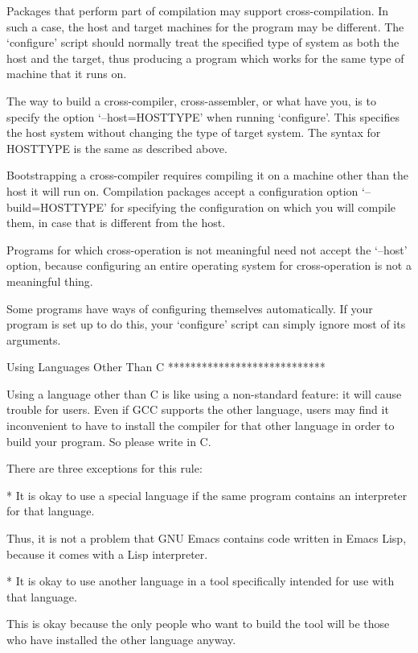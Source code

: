    Packages that perform part of compilation may support
cross-compilation.  In such a case, the host and target machines for
the program may be different.  The `configure' script should normally
treat the specified type of system as both the host and the target,
thus producing a program which works for the same type of machine that
it runs on.

   The way to build a cross-compiler, cross-assembler, or what have
you, is to specify the option `--host=HOSTTYPE' when running
`configure'.  This specifies the host system without changing the type
of target system.  The syntax for HOSTTYPE is the same as described
above.

   Bootstrapping a cross-compiler requires compiling it on a machine
other than the host it will run on.  Compilation packages accept a
configuration option `--build=HOSTTYPE' for specifying the
configuration on which you will compile them, in case that is different
from the host.

   Programs for which cross-operation is not meaningful need not accept
the `--host' option, because configuring an entire operating system for
cross-operation is not a meaningful thing.

   Some programs have ways of configuring themselves automatically.  If
your program is set up to do this, your `configure' script can simply
ignore most of its arguments.

Using Languages Other Than C
****************************

   Using a language other than C is like using a non-standard feature:
it will cause trouble for users.  Even if GCC supports the other
language, users may find it inconvenient to have to install the
compiler for that other language in order to build your program.  So
please write in C.

   There are three exceptions for this rule:

   * It is okay to use a special language if the same program contains
     an interpreter for that language.

     Thus, it is not a problem that GNU Emacs contains code written in
     Emacs Lisp, because it comes with a Lisp interpreter.

   * It is okay to use another language in a tool specifically intended
     for use with that language.

     This is okay because the only people who want to build the tool
     will be those who have installed the other language anyway.

